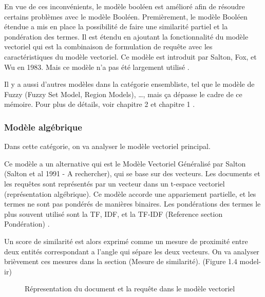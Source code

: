 En vue de ces inconvénients, le modèle booléen est amélioré afin de résoudre certains problèmes avec le modèle Booléen. Premièrement, le modèle Booléen étendue a mis en place la possibilité de faire une similarité partiel et la pondération des termes. Il est étendu en ajoutant la fonctionnalité du modèle vectoriel qui est la combinaison de formulation de requête avec les caractéristiques du modèle vectoriel. Ce modèle est introduit par Salton, Fox, et Wu en 1983. Mais ce modèle n'a pas été largement utilisé \citep{modern-ir}.

Il y a aussi d'autres modèles dans la catégorie ensembliste, tel que le modèle de Fuzzy (Fuzzy Set Model, Region Models), \dots, mais ça dépasse le cadre de ce mémoire. Pour plus de détails, voir chapitre 2 \citep{modern-ir} et chapitre 1 \citep{model-ir}.

\subsubsection{Modèle algébrique}
Dans cette catégorie, on va analyser le modèle vectoriel principal.

Ce modèle a un alternative qui est le Modèle Vectoriel Généralisé par Salton (Salton et al 1991 - A rechercher), qui se base sur des vecteurs. Les documents et les requêtes sont représentés par un vecteur dans un t-espace vectoriel (représentation algébrique). Ce modèle accorde une appariement partielle, et les termes ne sont pas pondérés de manières binaires. Les pondérations des termes le plus souvent utilisé sont la TF, IDF, et la TF-IDF (Reference section Pondération) \citep*{sarch-engine-vsm}.

Un score de similarité est alors exprimé comme un mesure de proximité entre deux entités correspondant a l'angle qui sépare les deux vecteurs. On va analyser brièvement ces mesures dans la section (Mesure de similarité). (Figure 1.4 model-ir)

\begin{figure}[htbp]
    \begin{center}
        \caption{Répresentation du document et la requête dans le modèle vectoriel \citep{model-ir}}
    \end{center}
    \label{vector-model}
\end{figure}

